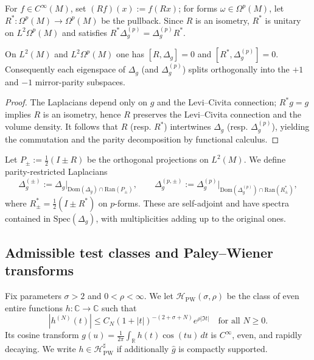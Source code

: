 \begin{definition}
\label{def:mirror-action}
For $f\in C^\infty(M)$, set $(Rf)(x):=f(Rx)$; for forms $\omega\in\Omega^p(M)$, let $R^*:\Omega^p(M)\to\Omega^p(M)$ be the pullback. Since $R$ is an isometry, $R^*$ is unitary on $L^2\Omega^p(M)$ and satisfies $R^*\Delta_g^{(p)}=\Delta_g^{(p)}R^*$. %
\end{definition}

\begin{proposition}
\label{prop:commute}
On $L^2(M)$ and $L^2\Omega^p(M)$ one has $[R,\Delta_g]=0$ and $[R^*,\Delta_g^{(p)}]=0$. Consequently each eigenspace of $\Delta_g$ (and $\Delta_g^{(p)}$) splits orthogonally into the $+1$ and $-1$ mirror-parity subspaces.
\end{proposition}

\begin{proof}
The Laplacians depend only on $g$ and the Levi–Civita connection; $R^*g=g$ implies $R$ is an isometry, hence $R$ preserves the Levi–Civita connection and the volume density. It follows that $R$ (resp. $R^*$) intertwines $\Delta_g$ (resp. $\Delta_g^{(p)}$), yielding the commutation and the parity decomposition by functional calculus. %
\end{proof}

\begin{definition}
\label{def:mirror-proj}
Let $P_\pm:=\tfrac{1}{2}(I\pm R)$ be the orthogonal projections on $L^2(M)$. We define parity-restricted Laplacians
\[
\Delta_g^{(\pm)}:=\Delta_g\big|_{\mathrm{Dom}(\Delta_g)\cap \mathrm{Ran}(P_\pm)},\qquad
\Delta_g^{(p,\pm)}:=\Delta_g^{(p)}\big|_{\mathrm{Dom}(\Delta_g^{(p)})\cap \mathrm{Ran}(R^*_\pm)},
\]
where $R^*_\pm=\tfrac{1}{2}(I\pm R^*)$ on $p$-forms. These are self-adjoint and have spectra contained in $\mathrm{Spec}(\Delta_g)$, with multiplicities adding up to the original ones. %
\end{definition}

\subsection{Admissible test classes and Paley–Wiener transforms}
\label{subsec:ch6-part1-pw} \relax

\begin{definition}
\label{def:PW}
Fix parameters $\sigma>2$ and $0<\rho<\infty$. We let $\mathcal{H}_{\mathrm{PW}}(\sigma,\rho)$ be the class of even entire functions $h:\mathbb{C}\to\mathbb{C}$ such that
\[
|h^{(N)}(t)| \le C_N (1+|t|)^{-(2+\sigma+N)} e^{\rho |\Im t|}\quad \text{for all }N\ge 0.
\]
Its cosine transform $g(u)=\frac{1}{2\pi}\int_{\mathbb{R}} h(t)\cos(tu)\,dt$ is $C^\infty$, even, and rapidly decaying. We write $h\in\mathcal{H}_{\mathrm{PW}}^\sharp$ if additionally $\widehat{g}$ is compactly supported. %
\end{definition}

